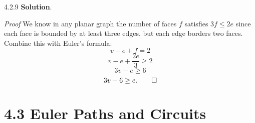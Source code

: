 \documentclass[11pt,]{book}
\makeatletter
\theoremstyle{ptxplainnotitle}
\theoremstyle{ptxplaintitle}
\renewcommand*{\proofname}{Proof}
\renewenvironment{proof}[1][\proofname]{\par
  \pushQED{\qed}%
  \normalfont \topsep6\p@\@plus6\p@\relax
  \trivlist
  \item\relax
    {\itshape
    #1\@addpunct{.}}\hspace\labelsep\ignorespaces
}{%
  \popQED\endtrivlist\@endpefalse
}
\theoremstyle{ptxdefinitionnotitle}
\theoremstyle{ptxdefinitiontitle}
\theoremstyle{ptxdefinitionnotitle}
\theoremstyle{ptxdefinitiontitle}
\theoremstyle{ptxdefinitionnotitle}
\theoremstyle{ptxdefinitiontitle}
\theoremstyle{ptxdefinitiontitlenonumber}
\theoremstyle{ptxdefinitiontitlenonumber}
\numberwithin{equation}{chapter}
\makeatother
\begin{document}
\begin{divisionexercise}{4.2.9}
\textbf{Solution}.\quad%
\begin{proof}\hypertarget{proof-41}{}
\hypertarget{p-2720}{}%
We know in any planar graph the number of faces \(f\) satisfies \(3f \le 2e\) since each face is bounded by at least three edges, but each edge borders two faces. Combine this with Euler's formula:%
\begin{equation*}
v - e + f = 2
\end{equation*}
%
\begin{equation*}
v - e + \frac{2e}{3} \ge 2
\end{equation*}
%
\begin{equation*}
3v - e \ge 6
\end{equation*}
%
\begin{equation*}
3v - 6 \ge e.\qedhere
\end{equation*}
%
\end{proof}
\end{divisionexercise}%
\section*{4.3 Euler Paths and Circuits}
\end{document}
